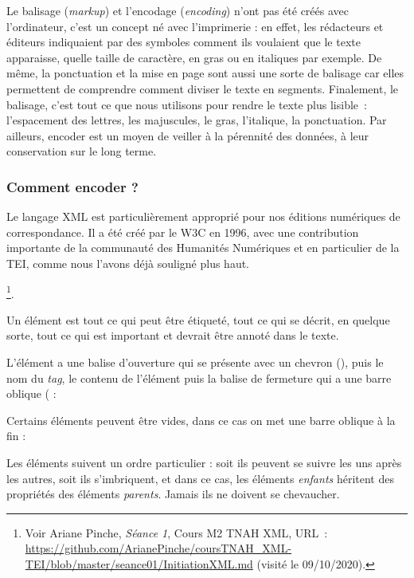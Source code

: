 Le balisage (\emph{markup}) et l'encodage (\emph{encoding}) n'ont pas été créés avec l'ordinateur, c'est un concept né avec l'imprimerie : en effet, les rédacteurs et éditeurs indiquaient par des symboles comment ils voulaient que le texte apparaisse, quelle taille de caractère, en gras ou en italiques par exemple. De même, la ponctuation et la mise en page sont aussi une sorte de balisage car elles permettent de comprendre comment diviser le texte en segments. Finalement, le balisage, c’est tout ce que nous utilisons pour rendre le texte plus lisible : l’espacement des lettres, les majuscules, le gras, l’italique, la ponctuation. Par ailleurs, encoder est un moyen de veiller à la pérennité des données, à leur conservation sur le long terme.

\subsubsection{Comment encoder ?}

Le langage XML est particulièrement approprié pour nos éditions numériques de correspondance. Il a été créé par le W3C en 1996, avec une contribution importante de la communauté des Humanités Numériques et en particulier de la TEI, comme nous l'avons déjà souligné plus haut.

\footnote{Voir Ariane Pinche, \emph{Séance 1}, Cours M2 TNAH XML, URL~: \url{https://github.com/ArianePinche/coursTNAH_XML-TEI/blob/master/seance01/InitiationXML.md} (visité le 09/10/2020).}.

Un élément est tout ce qui peut être étiqueté, tout ce qui se décrit, en quelque sorte, tout ce qui est important et devrait être annoté dans le texte.

L'élément a une balise d'ouverture qui se présente avec un chevron (\citecode{<)}), puis le nom du \emph{tag}, le contenu de l'élément puis la balise de fermeture qui a une barre oblique (\citecode{/)} : 


Certains éléments peuvent être vides, dans ce cas on met une barre oblique à la fin : 


Les éléments suivent un ordre particulier : soit ils peuvent se suivre les uns après les autres, soit ils s'imbriquent, et dans ce cas, les éléments \emph{enfants} héritent des propriétés des éléments \emph{parents}. Jamais ils ne doivent se chevaucher.

